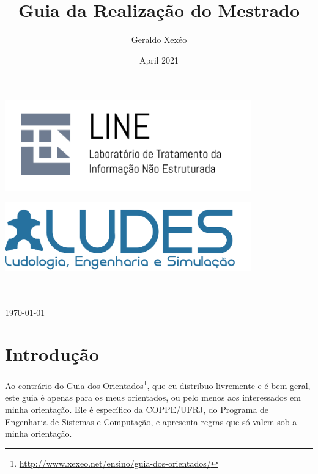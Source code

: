 \documentclass[a4paper,12pt]{report}
\title{Guia da Realização do Mestrado}
\author{Geraldo Xexéo}
\date{April 2021}
\begin{document}

\makeatletter
\begin{titlepage}
\begin{center}
\includegraphics[width=0.8\textwidth]{imagens/logo-line-modificado.PNG}
\par
\includegraphics[width=0.8\textwidth]{imagens/LUDES_PP-03.png}
\par
\vspace{3cm}
\Huge{\textbf{\@title}}
\\[1cm]
\LARGE
\@author
\\[.3cm]
\normalsize
\today
\end{center}
\end{titlepage}
\thispagestyle{empty}
\makeatother


\maketitle


\tableofcontents



\chapter{Introdução}

Ao contrário do Guia dos Orientados\footnote{\url{http://www.xexeo.net/ensino/guia-dos-orientados/}}, que eu distribuo livremente e é bem geral, este guia é apenas para os meus orientados, ou pelo menos aos interessados em minha orientação. Ele é específico da COPPE/UFRJ, do Programa de Engenharia de Sistemas e Computação, e apresenta regras que só valem sob a minha orientação.

\end{document}
